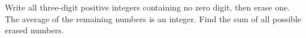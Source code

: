Write all three-digit positive integers containing no zero digit, then erase one. The average of the remaining numbers is an integer. Find the sum of all possible erased numbers.

